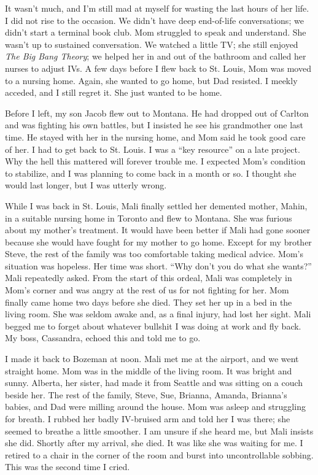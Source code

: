 It wasn't much, and I'm still mad at myself for wasting the last hours
of her life. I did not rise to the occasion. We didn't have deep
end-of-life conversations; we didn't start a terminal book club. Mom
struggled to speak and understand. She wasn't up to sustained
conversation. We watched a little TV; she still enjoyed \emph{The Big
Bang Theory}; we helped her in and out of the bathroom and called her
nurses to adjust IVs. A few days before I flew back to St. Louis, Mom
was moved to a nursing home. Again, she wanted to go home, but Dad
resisted. I meekly acceded, and I still regret it. She just wanted to be
home.

Before I left, my son Jacob flew out to Montana. He had dropped out of
Carlton and was fighting his own battles, but I insisted he see his
grandmother one last time. He stayed with her in the nursing home, and
Mom said he took good care of her. I had to get back to St. Louis. I was
a ``key resource'' on a late project. Why the hell this mattered will
forever trouble me. I expected Mom's condition to stabilize, and I was
planning to come back in a month or so. I thought she would last longer,
but I was utterly wrong.

While I was back in St. Louis, Mali finally settled her demented mother,
Mahin, in a suitable nursing home in Toronto and flew to Montana. She
was furious about my mother's treatment. It would have been better if
Mali had gone sooner because she would have fought for my mother to go
home. Except for my brother Steve, the rest of the family was too
comfortable taking medical advice. Mom's situation was hopeless. Her
time was short. ``Why don't you do what she wants?'' Mali repeatedly
asked. From the start of this ordeal, Mali was completely in Mom's
corner and was angry at the rest of us for not fighting for her. Mom
finally came home two days before she died. They set her up in a bed in
the living room. She was seldom awake and, as a final injury, had lost
her sight. Mali begged me to forget about whatever bullshit I was doing
at work and fly back. My boss, Cassandra, echoed this and told me to go.

I made it back to Bozeman at noon. Mali met me at the airport, and we
went straight home. Mom was in the middle of the living room. It was
bright and sunny. Alberta, her sister, had made it from Seattle and was
sitting on a couch beside her. The rest of the family, Steve, Sue,
Brianna, Amanda, Brianna's babies, and Dad were milling around the
house. Mom was asleep and struggling for breath. I rubbed her badly
IV-bruised arm and told her I was there; she seemed to breathe a little
smoother. I am unsure if she heard me, but Mali insists she did. Shortly
after my arrival, she died. It was like she was waiting for me. I
retired to a chair in the corner of the room and burst into
uncontrollable sobbing. This was the second time I cried.

